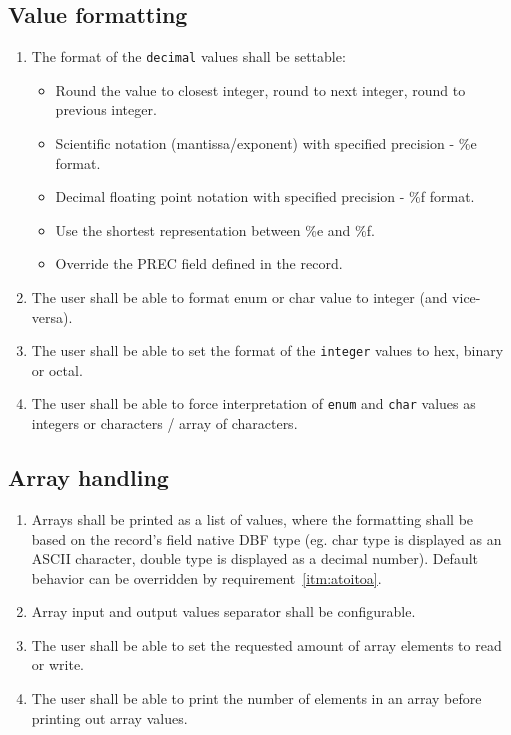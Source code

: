 \documentclass[12pt,a4paper]{article}
\begin{document}
\subsection{Value formatting}
\begin{enumerate}
	\item The format of the \texttt{decimal} values shall be settable:
	\begin{itemize}
		\item Round the value to closest integer, round to next integer, round to previous integer.
		\item Scientific notation (mantissa/exponent) with specified precision - \%e format.
		\item Decimal floating point notation with specified precision - \%f format.
		\item Use the shortest representation between \%e and \%f.
		\item Override the PREC field defined in the record.
	\end{itemize}
	\item The user shall be able to format enum or char value to integer (and vice-versa).
	\item The user shall be able to set the format of the \texttt{integer} values to hex, binary or octal.
	\item \label{itm:atoitoa} The user shall be able to force interpretation of \texttt{enum} and \texttt{char} values as integers or characters / array of characters.
\end{enumerate}

\subsection{Array handling}
\begin{enumerate}
	\item Arrays shall be printed as a list of values, where the formatting shall be based on the record's field native DBF type (eg. char type is displayed as an ASCII character, double type is displayed as a decimal number). Default behavior can be overridden by requirement~\ref{itm:atoitoa}.
	\item Array input and output values separator shall be configurable.
	\item The user shall be able to set the requested amount of array elements to read or write.
	\item The user shall be able to print the number of elements in an array before printing out array values.
\end{enumerate}
\end{document}
